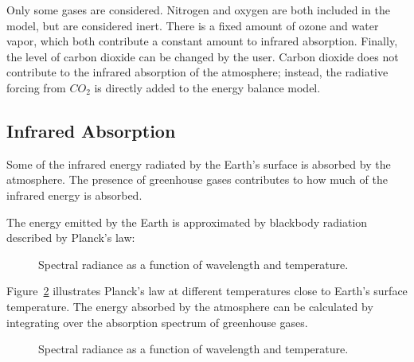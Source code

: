 \documentclass[12pt]{article} %
\begin{document}
Only some gases are considered. Nitrogen and oxygen are both included in the model, but are considered inert. There is a fixed amount of ozone and water vapor, which both contribute a constant amount to infrared absorption. Finally, the level of carbon dioxide can be changed by the user. Carbon dioxide does not contribute to the infrared absorption of the atmosphere; instead, the radiative forcing from $CO_2$ is directly added to the energy balance model.


\subsection{Infrared Absorption}

Some of the infrared energy radiated by the Earth's surface is absorbed by the atmosphere. The presence of greenhouse gases contributes to how much of the infrared energy is absorbed.

The energy emitted by the Earth is approximated by blackbody radiation described by Planck's law:

\begin{figure}[H]
	\caption{Spectral radiance as a function of wavelength and temperature.}
	\label{fig:planck_law}
\end{figure}

Figure~\ref{fig:planck} illustrates Planck's law at different temperatures close to Earth's surface temperature. The energy absorbed by the atmosphere can be calculated by integrating over the absorption spectrum of greenhouse gases. 

\begin{figure}[H]
	\caption{Spectral radiance as a function of wavelength and temperature.}
	\label{fig:planck}
\end{figure}
\end{document}
